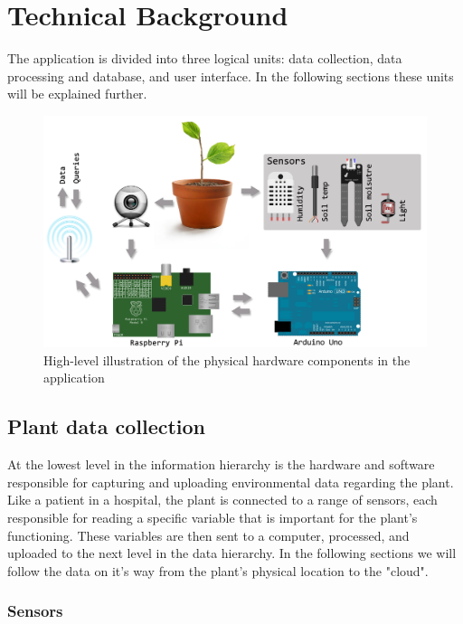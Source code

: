\chapter{Technical Background}

The application is divided into three logical units: data collection, data processing and database, and user interface. In the following sections these units will be explained further. 

\begin{figure}
\centering
\includegraphics[width=1\textwidth]{img/hardware/application.png}
\caption{High-level illustration of the physical hardware components in the application}
\label{fig:application}
\end{figure}

\section{Plant data collection}
At the lowest level in the information hierarchy is the hardware and software responsible for capturing and uploading environmental data regarding the plant. Like a patient in a hospital, the plant is connected to a range of sensors, each responsible for reading a specific variable that is important for the plant’s functioning. These variables are then sent to a computer, processed, and uploaded to the next level in the data hierarchy. In the following sections we will follow the data on it’s way from the plant’s physical location to the "cloud".

\subsection{Sensors}

